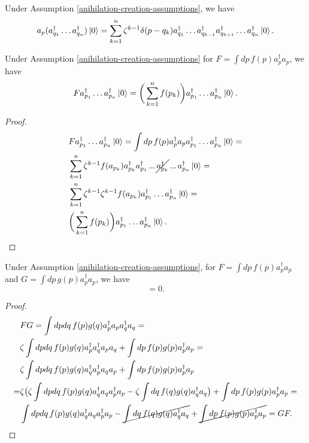 \documentclass[main.tex]{subfiles}
\begin{document}
\begin{corollary}
Under Assumption \ref{anihilation-creation-assumptions}, we have
\begin{equation}
a_p (a_{q_1}^\dagger \dots a_{q_n}^\dagger) \ket{0} = \sum_{k=1}^n\zeta^{k-1} \delta(p - q_k) a_{q_1}^\dagger \dots a_{q_{k - 1}}^\dagger a_{q_{k + 1}}^\dagger  \dots a_{q_n}^\dagger \ket{0}.
\end{equation}
\end{corollary}

\begin{proposition}
\label{count-operators}
Under Assumption \ref{anihilation-creation-assumptions} for $F = \int dp\, f(p)a^\dagger_p a_p$, we have
\begin{equation}
F a^\dagger_{p_1} \dots a^\dagger_{p_n}\ket{0} = \bigg( \sum_{k = 1}^n f(p_k)\bigg) a^\dagger_{p_1}  \dots a^\dagger_{p_n}\ket{0}.
\end{equation}
\end{proposition}
\begin{proof}
\begin{align*}
& F a^\dagger_{p_1} \dots a^\dagger_{p_n}\ket{0} = \int dp\, f(p)a^\dagger_p a_p a^\dagger_{p_1}  \dots a^\dagger_{p_n}\ket{0} = \\
& \sum_{k=1}^n\zeta^{k-1} f(a_{p_k}) a^\dagger_{p_k}
a^\dagger_{p_1} \tdots \cancel{a^\dagger_{p_k}} \tdots a^\dagger_{p_n}\ket{0} = \\
& \sum_{k=1}^n\zeta^{k-1} \zeta^{k-1} f(a_{p_k}) a^\dagger_{p_1}  \dots a^\dagger_{p_n}\ket{0} = \\
& \bigg( \sum_{k = 1}^n f(p_k)\bigg) a^\dagger_{p_1}  \dots a^\dagger_{p_n}\ket{0}.
\end{align*}
\end{proof}

\begin{proposition} Under Assumption \ref{anihilation-creation-assumptions}, for
$F = \int dp\, f(p)a^\dagger_p a_p$ and $G = \int dp\, g(p)a^\dagger_p a_p$, we have
\begin{equation}
[F, G] = 0.
\end{equation} 
\end{proposition}
\begin{proof}
\begin{align*}
&FG = \int dp dq \,f(p)g(q) a^\dagger_p a_p a^\dagger_q a_q = \\
& \zeta \int dp dq \, f(p)g(q) a^\dagger_p  a^\dagger_q a_p a_q + \int dp\, f(p)g(p) a^\dagger_p a_p =  \\
& \zeta \int dp dq\, f(p)g(q) a^\dagger_q a^\dagger_p  a_q  a_p  + \int dp\, f(p)g(p) a^\dagger_p a_p \\ =
& \zeta \big( \zeta \int dp dq\, f(p)g(q) a^\dagger_q a_q a^\dagger_p   a_p - \zeta \int dq\, f(q)g(q) a^\dagger_q    a_q \big)  + \int dp\, f(p)g(p) a^\dagger_p a_p = \\
& \int dp dq\, f(p)g(q) a^\dagger_q a_q a^\dagger_p   a_p - \cancel{\int dq \, f(q)g(q) a^\dagger_q    a_q}  + \cancel{\int dp\, f(p)g(p) a^\dagger_p a_p} 
= GF. \\ 
\end{align*}
\end{proof}
\end{document}
